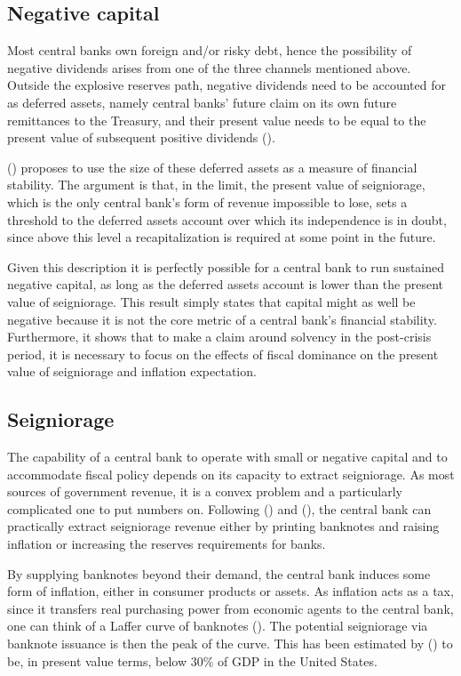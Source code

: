 \documentclass[american]{scrartcl}
\newcommand{\citein}[1]{\citeauthor{#1} (\citeyear{#1})}
\begin{document}
\subsection{Negative capital} \label{sec_negative}

Most central banks own foreign and/or risky debt, hence the possibility of negative dividends arises from one of the three channels mentioned above. Outside the explosive reserves path, negative dividends need to be accounted for as deferred assets, namely central banks' future claim on its own future remittances to the Treasury, and their present value needs to be equal to the present value of subsequent positive dividends (\cite{Archer2013}).

\citein{Reis2015} proposes to use the size of these deferred assets as a measure of financial stability. The argument is that, in the limit, the present value of seigniorage, which is the only central bank's form of revenue impossible to lose, sets a threshold to the deferred assets account over which its independence is in doubt, since above this level a recapitalization is required at some point in the future.

Given this description it is perfectly possible for a central bank to run sustained negative capital, as long as the deferred assets account is lower than the present value of seigniorage. This result simply states that capital might as well be negative because it is not the core metric of a central bank's financial stability. Furthermore, it shows that to make a claim around solvency in the post-crisis period, it is necessary to focus on the effects of fiscal dominance on the present value of seigniorage and inflation expectation.

\subsection{Seigniorage}

The capability of a central bank to operate with small or negative capital and to accommodate fiscal policy depends on its capacity to extract seigniorage. As most sources of government revenue, it is a convex problem and a particularly complicated one to put numbers on. Following \citein{Reis2016} and \citein{Hilscher2014}, the central bank can practically extract seigniorage revenue either by printing banknotes and raising inflation or increasing the reserves requirements for banks.

By supplying banknotes beyond their demand, the central bank induces some form of inflation, either in consumer products or assets. As inflation acts as a tax, since it transfers real purchasing power from economic agents to the central bank, one can think of a Laffer curve of banknotes (\cite[p.~17]{Reis2016}). The potential seigniorage via banknote issuance is then the peak of the curve. This has been estimated by \citein{Hilscher2014} to be, in present value terms, below 30\% of GDP in the United States.
\end{document}
